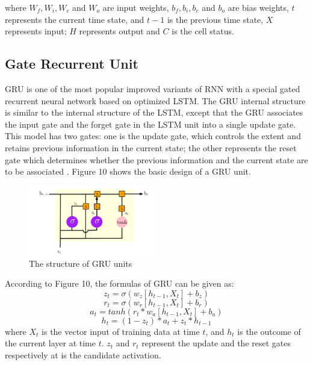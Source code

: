 \documentclass{ieeeojies}
\begin{document}
where $W_f, W_i, W_c$ and $W_o$ are input weights, $b_f, b_i, b_c$ and $b_o$ are bias weights, $t$ represents the current time state, and $t - 1$ is the previous time state, $X$ represents input; $H$ represents output and $C$ is the cell status.

\subsection{Gate Recurrent Unit}
GRU is one of the most popular improved variants of RNN with a special gated recurrent neural network based on optimized LSTM. The GRU internal structure is similar to the internal structure of the LSTM, except that the GRU associates the input gate and the forget gate in the LSTM unit into a single update gate. This model has two gates: one is the update gate, which controls the extent and retains previous information in the current state; the other represents the reset gate which determines whether the previous information and the current state are to be associated \cite{b14}. Figure 10 shows the basic design of a GRU unit.
\begin{figure} [H]
    \centering
    \includegraphics[width=0.5\textwidth]{bibliography/Figure/GRU.png}
    \caption{The structure of GRU units}
    \label{fig:GRU structure}
\end{figure}
According to Figure 10, the formulas of GRU can be given as:
\begin{equation}
    z_t = \sigma(w_z[h_{t - 1}, X_t] + b_z)
\end{equation}
\begin{equation}
    r_t = \sigma(w_r[h_{t - 1}, X_t] + b_r)
\end{equation}
\begin{equation}
    a_t = tanh(r_t * w_a[h_{t - 1}, X_t] + b_a)
\end{equation}
\begin{equation}
    h_t = (1 - z_t) * a_t + z_t * h_{t - 1}
\end{equation}
where $X_t$ is the vector input of training data at time $t$, and $h_t$ is the outcome of the current layer at time $t$. $z_t$ and $r_t$ represent the update and the reset gates respectively at is the candidate activation.
\end{document}
